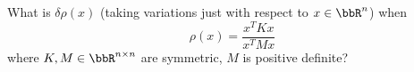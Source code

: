 \documentclass[12pt, leqno]{article}
\begin{document}

What is $\delta \rho(x)$ (taking variations just with respect 
to $x \in \bbR^n$) when
\[
  \rho(x) = \frac{x^T K x}{x^T M x}
\]
where $K, M \in \bbR^{n \times n}$ are symmetric, $M$ is positive definite?
\end{document}
